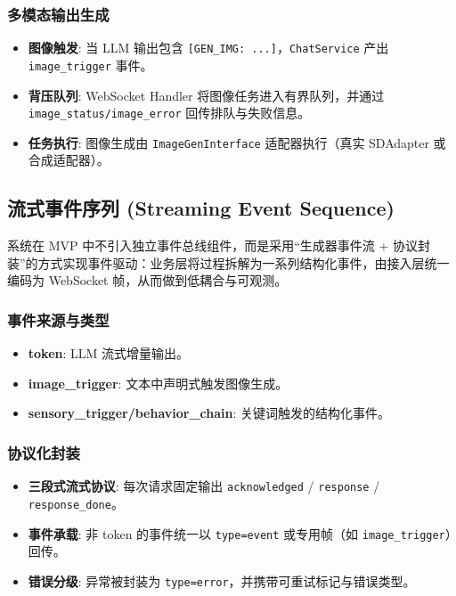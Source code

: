 \documentclass[a4paper,12pt]{article}
\begin{document}
\subsubsection{多模态输出生成}
\begin{itemize}
    \item \textbf{图像触发}: 当 LLM 输出包含 \texttt{[GEN\_IMG: ...]}，\texttt{ChatService} 产出 \texttt{image\_trigger} 事件。
    \item \textbf{背压队列}: WebSocket Handler 将图像任务进入有界队列，并通过 \texttt{image\_status/image\_error} 回传排队与失败信息。
    \item \textbf{任务执行}: 图像生成由 \texttt{ImageGenInterface} 适配器执行（真实 SDAdapter 或合成适配器）。
\end{itemize}

\subsection{流式事件序列 (Streaming Event Sequence)}

系统在 MVP 中不引入独立事件总线组件，而是采用“生成器事件流 + 协议封装”的方式实现事件驱动：业务层将过程拆解为一系列结构化事件，由接入层统一编码为 WebSocket 帧，从而做到低耦合与可观测。

\subsubsection{事件来源与类型}
\begin{itemize}
    \item \textbf{token}: LLM 流式增量输出。
    \item \textbf{image\_trigger}: 文本中声明式触发图像生成。
    \item \textbf{sensory\_trigger/behavior\_chain}: 关键词触发的结构化事件。
\end{itemize}

\subsubsection{协议化封装}
\begin{itemize}
    \item \textbf{三段式流式协议}: 每次请求固定输出 \texttt{acknowledged} / \texttt{response} / \texttt{response\_done}。
    \item \textbf{事件承载}: 非 token 的事件统一以 \texttt{type=event} 或专用帧（如 \texttt{image\_trigger}）回传。
    \item \textbf{错误分级}: 异常被封装为 \texttt{type=error}，并携带可重试标记与错误类型。
\end{itemize}
\end{document}
